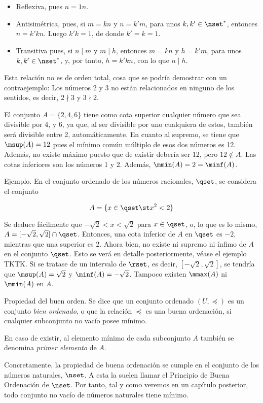 \begin{itemize}
  \item Reflexiva, pues $n = 1n$.
  \item Antisimétrica, pues, si $m = kn$ y $n = k'm$, para unos $k, k' \in
    \nset^*$, entonces $n = k'kn$. Luego $k'k = 1$, de donde $k' = k = 1$.
  \item Transitiva pues, si $n \mid m$ y $m \mid h$, entonces $m = kn$ y $h
    = k'm$, para unos $k, k' \in \nset^*$, y, por tanto, $h = k'kn$, con lo
    que $n \mid h$.
\end{itemize}

Esta relación no es de orden total, cosa que se podría demostrar con un
contraejemplo: Los números 2 y 3 no están relacionados en ninguno de los
sentidos, es decir, $2 \nmid 3$ y $3 \nmid 2$.

El conjunto $A = \{2, 4, 6\}$ tiene como cota superior cualquier número que
sea divisible por 4, y 6, ya que, al ser divisible por uno cualquiera de
estos, también será divisible entre 2, automáticamente. En cuanto al
supremo, se tiene que $\msup(A) = 12$ pues el mínimo común múltiplo de esos
dos números es 12. Además, no existe máximo puesto que de existir debería
ser 12, pero $12 \notin A$. Las cotas inferiores son los números 1 y 2.
Además, $\mmin(A) = 2 = \minf(A)$.

Ejemplo. En el conjunto ordenado de los números racionales, $\qset$, se
considera el conjunto

$$ A = \{x \in \qset \st x^2 < 2\} $$

Se deduce fácilmente que ${-\sqrt{2}} < x < \sqrt{2}$ para $x \in \qset$, o,
lo que es lo mismo, $A = [{-\sqrt{2}}, \sqrt{2}] \cap \qset$. Entonces, una
cota inferior de $A$ en $\qset$ es ${-2}$, mientras que una superior es 2.
Ahora bien, no existe ni supremo ni ínfimo de $A$ en el conjunto $\qset$.
Esto se verá en detalle posteriormente, véase el ejemplo TKTK. Si se tratase
de un intervalo de $\rset$, es decir, $[{-\sqrt{2}}, \sqrt{2}]$, se tendría
que $\msup(A) = \sqrt{2}$ y $\minf(A) = {-\sqrt{2}}$. Tampoco existen
$\mmax(A)$ ni $\mmin(A)$ en $A$.

Propiedad del buen orden. Se dice que un conjunto ordenado $(U, \preceq)$ es
un conjunto \emph{bien ordenado}, o que la relación $\preceq$ es una buena
ordenación, si cualquier subconjunto no vacío posee mínimo.

En caso de existir, al elemento mínimo de cada subconjunto $A$ también se
denomina \emph{primer elemento} de $A$.

Concretamente, la propiedad de buena ordenación se cumple en el conjunto de
los números naturales, $\nset$. A esta la suelen llamar el Principio de
Buena Ordenación de $\nset$. Por tanto, tal y como veremos en un capítulo
posterior, todo conjunto no vacío de números naturales tiene mínimo.

